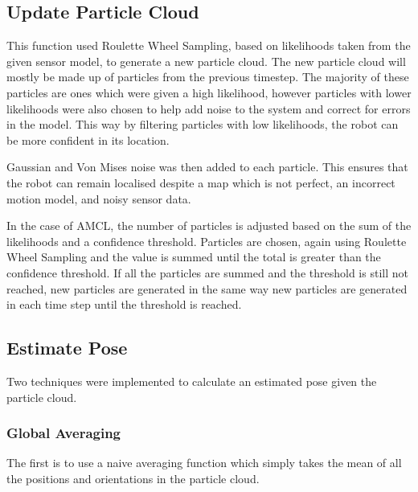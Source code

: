 \documentclass[a4paper, 10pt, conference]{ieeeconf}      %
\begin{document}
\subsection{Update Particle Cloud}
This function used Roulette Wheel Sampling, based on likelihoods taken from the given sensor model, to generate a new particle cloud. The new particle cloud will mostly be made up of particles from the previous timestep. The majority of these particles are ones which were given a high likelihood, however particles with lower likelihoods were also chosen to help add noise to the system and correct for errors in the model. This way by filtering particles with low likelihoods, the robot can be more confident in its location.

Gaussian and Von Mises noise was then added to each particle. This ensures that the robot can remain localised despite a map which is not perfect, an incorrect motion model, and noisy sensor data.

In the case of AMCL, the number of particles is adjusted based on the sum of the likelihoods and a confidence threshold. Particles are chosen, again using Roulette Wheel Sampling and the value is summed until the total is greater than the confidence threshold. If all the particles are summed and the threshold is still not reached, new particles are generated in the same way new particles are generated in each time step until the threshold is reached.


\subsection{Estimate Pose}
Two techniques were implemented to calculate an estimated pose given the particle cloud.

\subsubsection{Global Averaging}
The first is to use a naive averaging function which simply takes the mean of all the positions and orientations in the particle cloud. 
\end{document}
